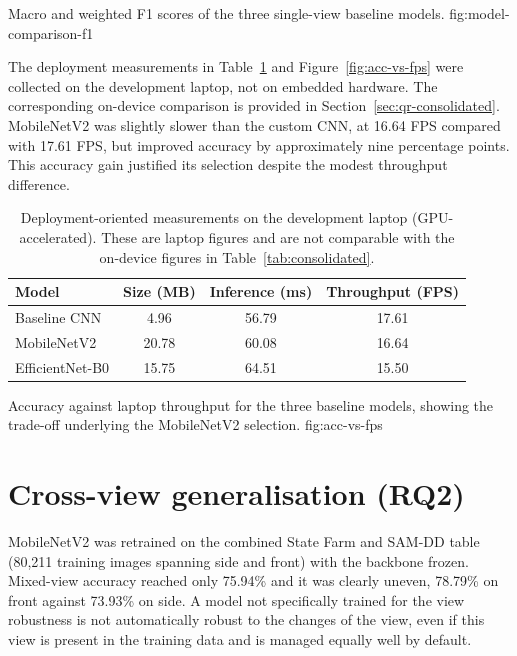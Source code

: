 {Macro and weighted F1 scores of the three single-view baseline models.}
{fig:model-comparison-f1}

The deployment measurements in Table~\ref{tab:deployment} and Figure~\ref{fig:acc-vs-fps} were collected on the development laptop, not on embedded hardware. The corresponding on-device comparison is provided in Section~\ref{sec:qr-consolidated}. MobileNetV2 was slightly slower than the custom CNN, at 16.64 FPS compared with 17.61 FPS, but improved accuracy by approximately nine percentage points. This accuracy gain justified its selection despite the modest throughput difference.


\begin{table}[htbp]
\centering
\caption{Deployment-oriented measurements on the development laptop (GPU-accelerated). These are laptop figures and are not comparable with the on-device figures in Table~\ref{tab:consolidated}.}
\label{tab:deployment}
\small
\begin{tabular}{lccc}
\toprule
\textbf{Model} & \textbf{Size (MB)} & \textbf{Inference (ms)} & \textbf{Throughput (FPS)} \\
\midrule
Baseline CNN & 4.96 & 56.79 & 17.61 \\
MobileNetV2 & 20.78 & 60.08 & 16.64 \\
EfficientNet-B0 & 15.75 & 64.51 & 15.50 \\
\bottomrule
\end{tabular}
\end{table}

{Accuracy against laptop throughput for the three baseline models, showing the trade-off underlying the MobileNetV2 selection.}
{fig:acc-vs-fps}

\FloatBarrier

\section{Cross-view generalisation (RQ2)}
\label{sec:qr-crossview}

MobileNetV2 was retrained on the combined State Farm and SAM-DD table (80,211 training images spanning side and front) with the backbone frozen. Mixed-view accuracy reached only 75.94\% and it was clearly uneven, 78.79\% on front against 73.93\% on side. A model not specifically trained for the view robustness is not automatically robust to the changes of the view, even if this view is present in the training data and is managed equally well by default.

